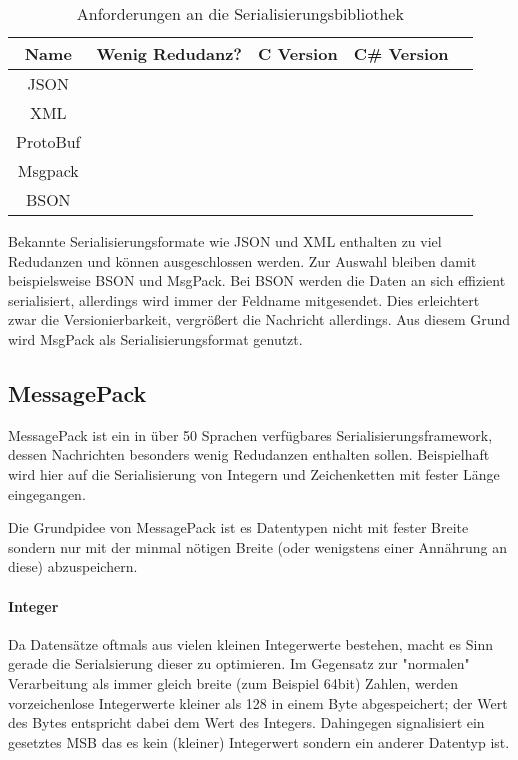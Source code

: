 \begin{table}[h]
\centering
\begin{tabu}{c | c | c | c | p{5cm}}
	\toprule
	Name & Wenig Redudanz? & C Version & C\# Version \\
	\midrule
	JSON & \xmark & \checkmark & \checkmark \\
	XML & \xmark & \checkmark & \checkmark \\
	ProtoBuf & \checkmark & \xmark\footnotemark & \checkmark \\
	Msgpack\cite{msgpack} & \checkmark & \checkmark & \checkmark \\
	BSON & \checkmark & \checkmark & \checkmark \\
	\bottomrule
\end{tabu}
\caption{Anforderungen an die Serialisierungsbibliothek}
\end{table}

Bekannte Serialisierungsformate wie JSON und XML enthalten zu viel Redudanzen und k{\"{o}}nnen ausgeschlossen werden. Zur Auswahl bleiben damit beispielsweise BSON und MsgPack.
Bei BSON werden die Daten an sich effizient serialisiert, allerdings wird immer der Feldname mitgesendet. Dies erleichtert zwar die Versionierbarkeit, vergr{\"{o}}{\ss}ert
die Nachricht allerdings. Aus diesem Grund wird MsgPack als Serialisierungsformat genutzt.

\subsection{MessagePack}
MessagePack ist ein in {\"{u}}ber 50 Sprachen verf{\"{u}}gbares Serialisierungsframework, dessen Nachrichten besonders wenig Redudanzen enthalten sollen. Beispielhaft wird hier auf die Serialisierung von
Integern und Zeichenketten mit fester L{\"{a}}nge eingegangen.

Die Grundpidee von MessagePack ist es Datentypen nicht mit fester Breite sondern nur mit der minmal n{\"{o}}tigen Breite (oder wenigstens einer Ann{\"{a}}hrung an diese) abzuspeichern.
\paragraph{Integer} Da Datens{\"{a}}tze oftmals aus vielen kleinen Integerwerte bestehen, macht es Sinn gerade die Serialsierung dieser zu optimieren. Im Gegensatz zur "normalen" Verarbeitung als immer gleich breite (zum Beispiel 64bit) Zahlen, werden vorzeichenlose Integerwerte kleiner als 128 in einem Byte abgespeichert; der Wert des Bytes entspricht dabei dem Wert des Integers. Dahingegen signalisiert ein gesetztes MSB das es kein (kleiner) Integerwert sondern ein anderer Datentyp ist.
